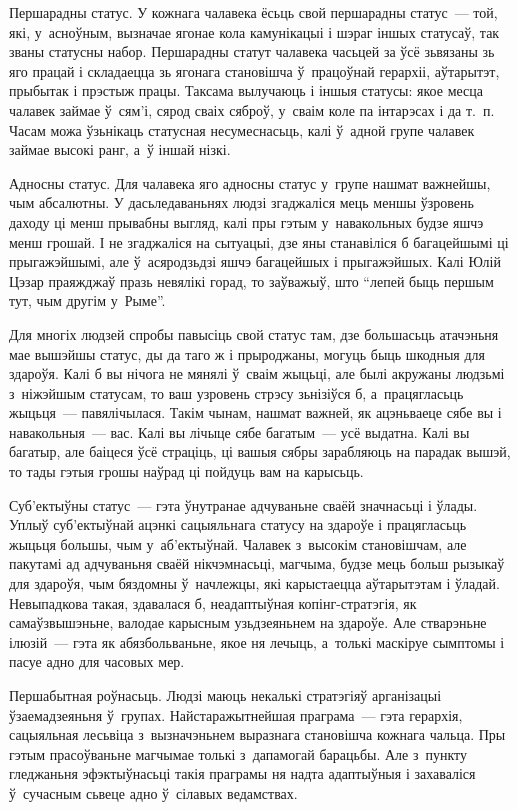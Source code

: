 Першарадны статус. У кожнага чалавека ёсьць свой першарадны статус~--- той, які, у~асноўным, вызначае ягонае кола камунікацыі і шэраг іншых статусаў, так званы статусны набор. Першарадны статут чалавека часьцей за ўсё зьвязаны зь яго працай і складаецца зь ягонага становішча ў~працоўнай герархіі, аўтарытэт, прыбытак і прэстыж працы. Таксама вылучаюць і іншыя статусы: якое месца чалавек займае ў~сям'і, сярод сваіх сяброў, у~сваім коле па інтарэсах і да т.~п. Часам можа ўзьнікаць статусная несумеснасьць, калі ў~адной групе чалавек займае высокі ранг, а~ў іншай нізкі.

Адносны статус. Для чалавека яго адносны статус у~групе нашмат важнейшы, чым абсалютны. У дасьледаваньнях людзі згаджаліся мець меншы ўзровень даходу ці менш прывабны выгляд, калі пры гэтым у~навакольных будзе яшчэ менш грошай. І не згаджаліся на сытуацыі, дзе яны станавіліся б багацейшымі ці прыгажэйшымі, але ў~асяродзьдзі яшчэ багацейшых і прыгажэйшых. Калі Юлій Цэзар праяжджаў празь невялікі горад, то заўважыў, што ``лепей быць першым тут, чым другім у~Рыме''.

Для многіх людзей спробы павысіць свой статус там, дзе большасьць атачэньня мае вышэйшы статус, ды да таго ж і прыроджаны, могуць быць шкодныя для здароўя. Калі б вы нічога не мянялі ў~сваім жыцьці, але былі акружаны людзьмі з~ніжэйшым статусам, то ваш узровень стрэсу зьнізіўся б, а~працягласьць жыцьця~--- павялічылася. Такім чынам, нашмат важней, як ацэньваеце сябе вы і навакольныя~--- вас. Калі вы лічыце сябе багатым~--- усё выдатна. Калі вы багатыр, але баіцеся ўсё страціць, ці вашыя сябры зарабляюць на парадак вышэй, то тады гэтыя грошы наўрад ці пойдуць вам на карысьць.

Суб'ектыўны статус~--- гэта ўнутранае адчуваньне сваёй значнасьці і ўлады. Уплыў суб'ектыўнай ацэнкі сацыяльнага статусу на здароўе і працягласьць жыцьця большы, чым у~аб'ектыўнай. Чалавек з~высокім становішчам, але пакутамі ад адчуваньня сваёй нікчэмнасьці, магчыма, будзе мець больш рызыкаў для здароўя, чым бяздомны ў~начлежцы, які карыстаецца аўтарытэтам і ўладай. Невыпадкова такая, здавалася б, неадаптыўная копінг-стратэгія, як самаўзвышэньне, валодае карысным узьдзеяньнем на здароўе. Але стварэньне ілюзій~--- гэта як абязбольваньне, якое ня лечыць, а~толькі маскіруе сымптомы і пасуе адно для часовых мер.

Першабытная роўнасьць. Людзі маюць некалькі стратэгіяў арганізацыі ўзаемадзеяньня ў~групах. Найстаражытнейшая праграма~--- гэта герархія, сацыяльная лесьвіца з~вызначэньнем выразнага становішча кожнага чальца. Пры гэтым прасоўваньне магчымае толькі з~дапамогай барацьбы. Але з~пункту гледжаньня эфэктыўнасьці такія праграмы ня надта адаптыўныя і захаваліся ў~сучасным сьвеце адно ў~сілавых ведамствах.

